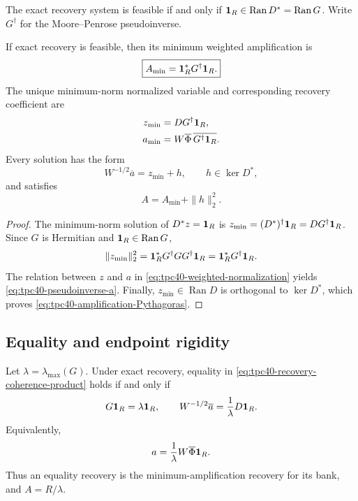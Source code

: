 The exact recovery system is feasible if and only if
\(\mathbf 1_R\in\operatorname{Ran}D^*=\operatorname{Ran}G\).  Write
\(G^\dagger\) for the Moore--Penrose pseudoinverse.

\begin{proposition}
\label{prop:tpc40-pseudoinverse-recovery}
If exact recovery is feasible, then its minimum weighted amplification is
\begin{equation}
 \boxed{A_{\min}=\mathbf 1_R^*G^\dagger\mathbf 1_R.}
 \label{eq:tpc40-pseudoinverse-amplification}
\end{equation}
The unique minimum-norm normalized variable and corresponding recovery
coefficient are
\begin{align}
 z_{\min}
 &=DG^\dagger\mathbf 1_R,
 \label{eq:tpc40-pseudoinverse-z}\\
 a_{\min}
 &=W\overline\Phi\,\overline{G^\dagger\mathbf 1_R}.
 \label{eq:tpc40-pseudoinverse-a}
\end{align}
Every solution has the form
\begin{equation}
 W^{-1/2}\overline a=z_{\min}+h,
 \qquad h\in\ker D^*,
 \label{eq:tpc40-all-recovery-solutions}
\end{equation}
and satisfies
\begin{equation}
 A=A_{\min}+\|h\|_2^2.
 \label{eq:tpc40-amplification-Pythagoras}
\end{equation}
\end{proposition}

\begin{proof}
The minimum-norm solution of \(D^*z=\mathbf 1_R\) is
\(z_{\min}=(D^*)^\dagger\mathbf 1_R=DG^\dagger\mathbf 1_R\).  Since \(G\) is
Hermitian and \(\mathbf 1_R\in\operatorname{Ran}G\),
\[
 \|z_{\min}\|_2^2
 =\mathbf 1_R^*G^\dagger G G^\dagger\mathbf 1_R
 =\mathbf 1_R^*G^\dagger\mathbf 1_R.
\]
The relation between \(z\) and \(a\) in
\eqref{eq:tpc40-weighted-normalization} yields
\eqref{eq:tpc40-pseudoinverse-a}.  Finally,
\(z_{\min}\in\operatorname{Ran}D\) is orthogonal to \(\ker D^*\), which
proves \eqref{eq:tpc40-amplification-Pythagoras}.
\end{proof}

\subsection{Equality and endpoint rigidity}

\begin{proposition}
\label{prop:tpc40-product-equality}
Let \(\lambda=\lambda_{\max}(G)\).  Under exact recovery, equality in
\eqref{eq:tpc40-recovery-coherence-product} holds if and only if
\begin{equation}
 G\mathbf 1_R=\lambda\mathbf 1_R,
 \qquad
 W^{-1/2}\overline a=\frac1\lambda D\mathbf 1_R.
 \label{eq:tpc40-product-equality-characterization}
\end{equation}
Equivalently,
\begin{equation}
 a=\frac1\lambda W\overline\Phi\mathbf 1_R.
 \label{eq:tpc40-product-equality-coefficient}
\end{equation}
Thus an equality recovery is the minimum-amplification recovery for its
bank, and \(A=R/\lambda\).
\end{proposition}


